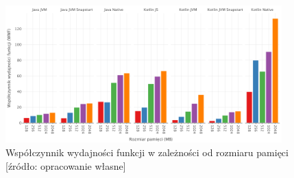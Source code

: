\begin{figure}[h]
    \centering
    \includegraphics[width=0.95\textwidth]{charts/results/wwf.png}
    \caption{Współczynnik wydajności funkcji w zależności od rozmiaru pamięci [źródło: opracowanie własne]}
    \label{fig:lambda_workflow}
\end{figure}
